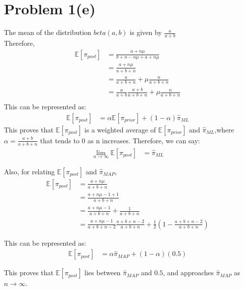 \documentclass[openany,11pt]{homework}
\begin{document}
\section*{Problem 1(e)}
The mean of the distribution $beta(a, b)$ is given by $\frac{a}{a+b}$ \\
Therefore, \\
\begin{align}
\mathbb{E}[\pi_{post}] & = \frac{a + n\mu}{b + n - n\mu + a + n\mu} \\
				& = \frac{a + n\mu}{a + b + n} \\
				& = \frac{a}{a+b+n} + \mu\frac{n}{a+b+n} \\
				& = \frac{a}{a+b}\frac{a+b}{a+b+n} + \mu\frac{n}{a+b+n} \\
\end{align}
This can be represented as:
\begin{align}
\mathbb{E}[\pi_{post}] & = \alpha\mathbb{E}[\pi_{prior}] + (1-\alpha)\hat{\pi}_{ML}
\end{align}
This proves that $\mathbb{E}[\pi_{post}]$ is a weighted average of $\mathbb{E}[\pi_{prior}]$ and $\hat{\pi}_{ML}$,where $\alpha = \frac{a+b}{a+b+n}$ that tends to 0 as n increases. Therefore, we can say:
\begin{align}
\lim_{n\to\infty}\mathbb{E}[\pi_{post}] & = \hat{\pi}_{ML}
\end{align}

Also, for relating $\mathbb{E}[\pi_{post}]$ and $\hat{\pi}_{MAP}$,
\begin{align}
	\mathbb{E}[\pi_{post}] & = \frac{a + n\mu}{a+b+n} \\
												 & = \frac{a + n\mu -1+1}{a+b+n} \\
												 & = \frac{a+n\mu-1}{a+b+n} + \frac{1}{a+b+n} \\
												 & = \frac{a+n\mu-1}{a+b+n-2}\frac{a+b+n-2}{a+b+n} + \frac{1}{2}\left(1-\frac{a+b+n-2}{a+b+n}\right)
\end{align}

This can be represented as:
\begin{align}
\mathbb{E}[\pi_{post}] & = \alpha\hat{\pi}_{MAP} + (1-\alpha)(0.5)
\end{align}

This proves that $\mathbb{E}[\pi_{post}]$ lies between $\hat{\pi}_{MAP}$ and $0.5$, and approaches $\hat{\pi}_{MAP}$ as $n \to \infty$.
\end{document}
